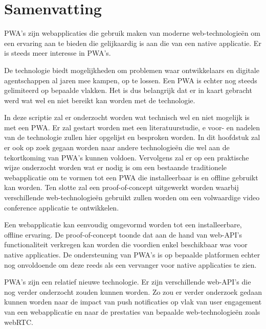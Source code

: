 





\chapter*{Samenvatting}

PWA's zijn webapplicaties die gebruik maken van moderne web-technologieën om een ervaring aan te bieden die gelijkaardig is aan die van een native applicatie. Er is steeds meer interesse in PWA's. \autocite{googleTrends2020}


De technologie biedt mogelijkheden om problemen waar ontwikkelaars en digitale agentschappen al jaren mee kampen, op te lossen.  Een PWA is echter nog steeds gelimiteerd op bepaalde vlakken. 
Het is dus belangrijk dat er in kaart gebracht werd wat wel en niet bereikt kan worden met de technologie.

In deze scriptie zal er onderzocht worden wat technisch wel en niet mogelijk is met een PWA. Er zal gestart worden met een literatuurstudie, e voor- en nadelen van de technologie zullen hier opgelijst en besproken worden.
In dit hoofdstuk zal er ook op zoek gegaan worden naar andere technologieën die wel aan de tekortkoming van PWA's kunnen voldoen.
Vervolgens zal er op een praktische wijze onderzocht worden wat er nodig is om een bestaande traditionele webapplicatie om te vormen tot een PWA die installeerbaar is en offline gebruikt kan worden.
Ten slotte zal een proof-of-concept uitgewerkt worden waarbij verschillende web-technologieën gebruikt zullen worden om een volwaardige video conference applicatie te ontwikkelen. 

Een webapplicatie kan eenvoudig omgevormd worden tot een installeerbare, offline ervaring. De proof-of-concept toonde dat aan de hand van web-API's functionaliteit verkregen kan worden die voordien enkel beschikbaar was voor native applicaties.
De ondersteuning van PWA's is op bepaalde platformen echter nog onvoldoende om deze reeds als een vervanger voor native applicaties te zien.

PWA's zijn een relatief nieuwe technologie. Er zijn verschillende web-API's die nog verder onderzocht zouden kunnen worden. Zo zou er verder onderzoek gedaan kunnen worden naar de impact van push notificaties op vlak van user engagement van een webapplicatie en naar de prestaties van bepaalde web-technologieën zoals webRTC.